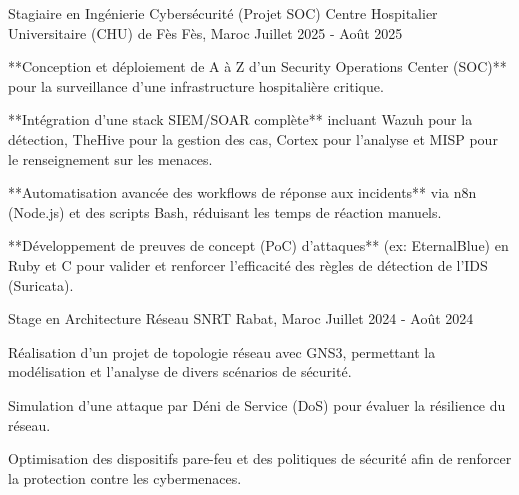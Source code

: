 \begin{cventries}

  \cventry
    {Stagiaire en Ingénierie Cybersécurité (Projet SOC)} %
    {Centre Hospitalier Universitaire (CHU) de Fès} %
    {Fès, Maroc} %
    {Juillet 2025 - Août 2025} %
    {
      \begin{cvitems}
        \item {**Conception et déploiement de A à Z d'un Security Operations Center (SOC)** pour la surveillance d'une infrastructure hospitalière critique.}
        \item {**Intégration d'une stack SIEM/SOAR complète** incluant Wazuh pour la détection, TheHive pour la gestion des cas, Cortex pour l'analyse et MISP pour le renseignement sur les menaces.}
        \item {**Automatisation avancée des workflows de réponse aux incidents** via n8n (Node.js) et des scripts Bash, réduisant les temps de réaction manuels.}
        \item {**Développement de preuves de concept (PoC) d'attaques** (ex: EternalBlue) en Ruby et C pour valider et renforcer l'efficacité des règles de détection de l'IDS (Suricata).}
      \end{cvitems}
    }
  \cventry
    {Stage en Architecture Réseau} %
    {SNRT} %
    {Rabat, Maroc} %
    {Juillet 2024 - Août 2024} %
    {
      \begin{cvitems} %
        \item {Réalisation d'un projet de topologie réseau avec GNS3, permettant la modélisation et l'analyse de divers scénarios de sécurité.}
        \item {Simulation d’une attaque par Déni de Service (DoS) pour évaluer la résilience du réseau.}
        \item {Optimisation des dispositifs pare-feu et des politiques de sécurité afin de renforcer la protection contre les cybermenaces.}
      \end{cvitems}
    }
\end{cventries}
